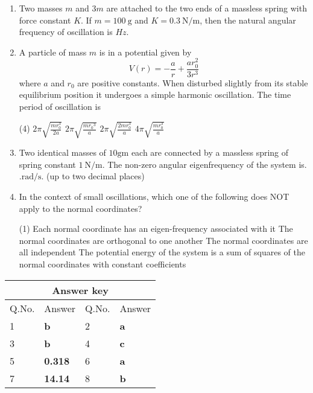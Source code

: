 \begin{enumerate}
	\item Two masses $m$ and $3 m$ are attached to the two ends of a massless spring with force constant $K$. If $m=100 \mathrm{~g}$ and $K=0.3 \mathrm{~N} / \mathrm{m}$, then the natural angular frequency of oscillation is $H z$.
{	}

	\item A particle of mass $m$ is in a potential given by
	$$
	V(r)=-\frac{a}{r}+\frac{a r_{0}^{2}}{3 r^{3}}
	$$
	where $a$ and $r_{0}$ are positive constants. When disturbed slightly from its stable equilibrium position it undergoes a simple harmonic oscillation. The time period of oscillation is
	{}
\begin{tasks}(4)
	\task[\textbf{A.}] $2 \pi \sqrt{\frac{m r_{0}^{3}}{2 a}}$
	\task[\textbf{B.}]$2 \pi \sqrt{\frac{m r_{0}{ }^{3}}{a}}$
	\task[\textbf{C.}]$2 \pi \sqrt{\frac{2 m r_{0}^{3}}{a}}$
	\task[\textbf{D.}]$4 \pi \sqrt{\frac{m r_{0}^{3}}{a}}$
\end{tasks}

	\item Two identical masses of $10 \mathrm{gm}$ each are connected by a massless spring of spring constant $1 \mathrm{~N} / \mathrm{m}$. The non-zero angular eigenfrequency of the system is. $. \mathrm{rad} / \mathrm{s} .$ (up to two decimal places)
{	}
	\item In the context of small oscillations, which one of the following does NOT apply to the normal coordinates?
	{}
\begin{tasks}(1)
	\task[\textbf{A.}] Each normal coordinate has an eigen-frequency associated with it
	\task[\textbf{B.}]The normal coordinates are orthogonal to one another
	\task[\textbf{C.}]The normal coordinates are all independent
	\task[\textbf{D.}]The potential energy of the system is a sum of squares of the normal coordinates with constant coefficients
\end{tasks}
\end{enumerate}
\setlength\arrayrulewidth{1pt}
\begin{table}[H]
	\centering
	
	\begin{tabular}{|p{1.5cm}|p{1.5cm}||p{1.5cm}|p{1.5cm}|}
		\hline
		\multicolumn{4}{|c|}{\textbf{Answer key}}\\\hline\hline
		\rowcolor{ocrel}Q.No.&Answer&Q.No.&Answer\\\hline
		1&\textbf{b}&2&\textbf{a}\\\hline
		3&\textbf{b}&4&\textbf{c}\\\hline
		5&\textbf{0.318}&6&\textbf{a}\\\hline
		7&\textbf{14.14}&8&\textbf{b}\\\hline
	\end{tabular}
\end{table}
